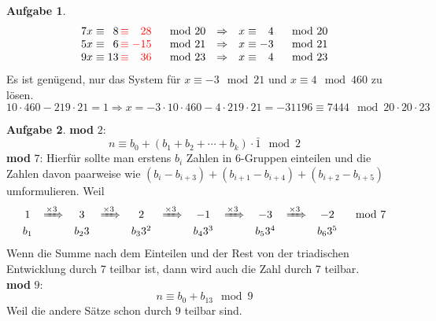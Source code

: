\documentclass{article}
\theoremstyle{definition}
\newtheorem{ub}{Aufgabe}
\begin{document}
\begin{ub}
	\[ 
	\begin{array}{lllll}
		7x \equiv \hphantom{1}8 \,{\color{red} \equiv \hphantom{-}28 } & \mod 20 & \Rightarrow & x \equiv \hphantom{-}4 & \mod 20 \\
		5x \equiv \hphantom{1}6 \,{\color{red} \equiv -15 } & \mod 21 & \Rightarrow & x \equiv -3 & \mod 21 \\
		9x \equiv 13 \,{\color{red} \equiv \hphantom{-}36 } & \mod 23 & \Rightarrow & x \equiv \hphantom{-}4 & \mod 23
	\end{array}
	 \]
	Es ist gen\"ugend, nur das System f\"ur $ x \equiv -3 \mod 21 $ und $ x \equiv 4 \mod 460 $ zu l\"osen.
	\[ 
	10 \cdot 460 - 219 \cdot 21 = 1 \Rightarrow x = -3 \cdot 10 \cdot 460 - 4 \cdot 219 \cdot 21 = -31196
	\equiv 7444 \mod 20 \cdot 20 \cdot 23
	 \]
\end{ub}
\begin{ub}
	\textbf{mod} $ 2 $:
	\[ n \equiv b_0 + (b_1 + b_2 + \cdots + b_k) \cdot \bar{1} \mod 2 \]
	\textbf{mod} $ 7 $: Hierf\"ur sollte man erstens $ b_i $ Zahlen in 6-Gruppen einteilen und die Zahlen davon paarweise wie $ (b_i - b_{i+3}) + (b_{i+1} - b_{i+4}) + (b_{i+2} - b_{i+5}) $ umformulieren. Weil 
	\[ 
	\begin{array}{cccccccccccccc}
		1 & \xRightarrow[]{\times 3} & 3 & \xRightarrow[]{\times 3} & 2 & \xRightarrow[]{\times 3}
		  & -1 & \xRightarrow[]{\times 3} & -3 & \xRightarrow[]{\times 3} & -2 & \mod 7 \\
		b_1 && b_23 && b_33^2 && b_43^3 && b_53^4 && b_63^5 &
	\end{array}
	 \]
	Wenn die Summe nach dem Einteilen und der Rest von der triadischen Entwicklung durch 7 teilbar ist, dann wird auch die Zahl durch 7 teilbar. \\
	\textbf{mod} $ 9 $:
	\[ 
	n \equiv b_0 + b_13 \mod 9
	 \]
	Weil die andere S\"atze schon durch $ 9 $ teilbar sind.
\end{ub}
\end{document}

